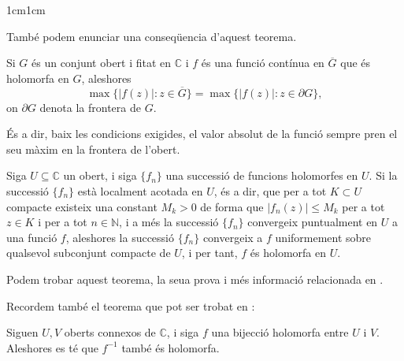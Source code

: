 \begin{adjustwidth}{1cm}{1cm}

També podem enunciar una conseqüencia d'aquest teorema.

\begin{teorema}
    Si $G$ és un conjunt obert i fitat en $\mathbb{C}$ i $f$ és una funció contínua en $\overline{G}$ que és holomorfa en $G$, aleshores 
    \[
        \max\{|f(z)|:z\in\overline{G}\}=\max\{|f(z)|:z\in\partial G\},
    \]
    on $\partial G$ denota la frontera de $G$.
    \label{conseq_teo_mod_max}
\end{teorema}

És a dir, baix les condicions exigides, el valor absolut de la funció sempre pren el seu màxim en la frontera de l'obert.

\begin{teorema}[de Vitali]
    Siga $U\subseteq \mathbb{C}$ un obert, i siga $\{f_n\}$ una successió de funcions holomorfes en $U$. Si la successió $\{f_n\}$ està localment acotada en $U$, és a dir, que per a tot $K\subset U$ compacte existeix una constant $M_k>0$ de forma que $|f_n(z)|\leq M_k$ per a tot $z\in K$ i per a tot $n\in\mathbb{N}$, i a més la successió $\{f_n\}$ convergeix puntualment en $U$ a una funció $f$, aleshores la successió $\{f_n\}$ convergeix a $f$ uniformement sobre qualsevol subconjunt compacte de $U$, i per tant, $f$ és holomorfa en $U$.

    Podem trobar aquest teorema, la seua prova i més informació relacionada en \cite[Cap. VII, Secció 2]{conway}.
    \label{vitali}
\end{teorema}

Recordem també el teorema que pot ser trobat en \cite[p. 99]{conway}:

\begin{teorema}
    Siguen $U,V$ oberts connexos de $\mathbb{C}$, i siga $f$ una bijecció holomorfa entre $U$ i $V$. Aleshores es té que $f^{-1}$ també és holomorfa.
    \label{bij_holo_te_inv_holo}
\end{teorema}



\end{adjustwidth}
